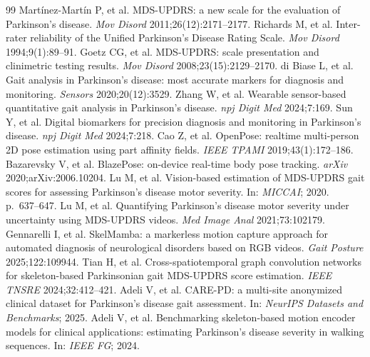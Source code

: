 \documentclass[preprint,12pt]{elsarticle}
\begin{document}

\begin{thebibliography}{99}
 Mart\'inez-Mart\'in P, et al. MDS-UPDRS: a new scale for the evaluation of Parkinson's disease. \textit{Mov Disord} 2011;26(12):2171--2177.
 Richards M, et al. Inter-rater reliability of the Unified Parkinson's Disease Rating Scale. \textit{Mov Disord} 1994;9(1):89--91.
 Goetz CG, et al. MDS-UPDRS: scale presentation and clinimetric testing results. \textit{Mov Disord} 2008;23(15):2129--2170.
 di Biase L, et al. Gait analysis in Parkinson's disease: most accurate markers for diagnosis and monitoring. \textit{Sensors} 2020;20(12):3529.
 Zhang W, et al. Wearable sensor-based quantitative gait analysis in Parkinson's disease. \textit{npj Digit Med} 2024;7:169.
 Sun Y, et al. Digital biomarkers for precision diagnosis and monitoring in Parkinson's disease. \textit{npj Digit Med} 2024;7:218.
 Cao Z, et al. OpenPose: realtime multi-person 2D pose estimation using part affinity fields. \textit{IEEE TPAMI} 2019;43(1):172--186.
 Bazarevsky V, et al. BlazePose: on-device real-time body pose tracking. \textit{arXiv} 2020;arXiv:2006.10204.
 Lu M, et al. Vision-based estimation of MDS-UPDRS gait scores for assessing Parkinson's disease motor severity. In: \textit{MICCAI}; 2020. p.\ 637--647.
 Lu M, et al. Quantifying Parkinson's disease motor severity under uncertainty using MDS-UPDRS videos. \textit{Med Image Anal} 2021;73:102179.
 Gennarelli I, et al. SkelMamba: a markerless motion capture approach for automated diagnosis of neurological disorders based on RGB videos. \textit{Gait Posture} 2025;122:109944.
 Tian H, et al. Cross-spatiotemporal graph convolution networks for skeleton-based Parkinsonian gait MDS-UPDRS score estimation. \textit{IEEE TNSRE} 2024;32:412--421.
 Adeli V, et al. CARE-PD: a multi-site anonymized clinical dataset for Parkinson's disease gait assessment. In: \textit{NeurIPS Datasets and Benchmarks}; 2025.
 Adeli V, et al. Benchmarking skeleton-based motion encoder models for clinical applications: estimating Parkinson's disease severity in walking sequences. In: \textit{IEEE FG}; 2024.

\end{thebibliography}
\end{document}
